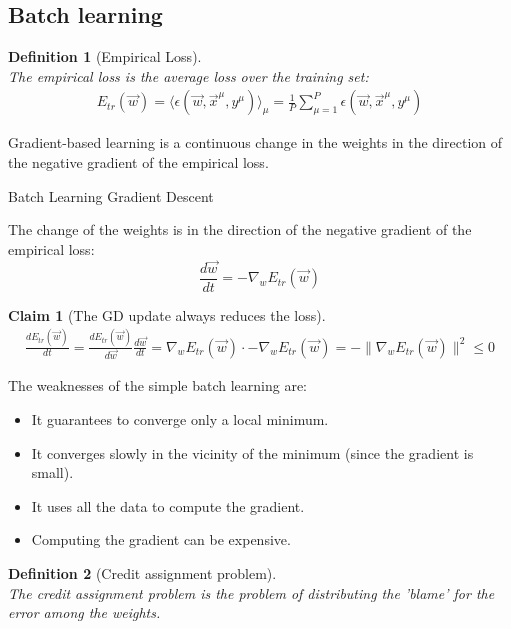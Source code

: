 \documentclass[11pt]{book} %
\newtheorem{definition}{Definition}[section]
\newtheorem*{claim*}{Claim}
\begin{document}
%
%

\subsection{Batch learning}

\begin{definition}[Empirical Loss]\ \\
    The empirical loss is the average loss over the training set:
    \begin{align}
        E_{tr}(\vec{w}) = \langle \epsilon(\vec{w}, \vec{x}^\mu, y^\mu ) \rangle_\mu =\frac{1}{P} \sum_{\mu=1}^{P} \epsilon (\vec{w}, \vec{x}^\mu, y^\mu)
    \end{align}
\end{definition}

Gradient-based learning is a continuous change in the weights in the direction of the negative gradient of the empirical loss.

\begin{algorithm}[H]
    \SetAlgoLined
    \caption{Batch Learning Gradient Descent}
    The change of the weights is in the direction of the negative gradient of the empirical loss:
    \[ \frac{d\vec{w}}{dt} = -\nabla_w E_{tr}(\vec{w}) \]
\end{algorithm}
    

\begin{claim*}[The GD update always reduces the loss]\ \\
    \begin{align}
        \frac{d E_{tr}(\vec{w})}{dt} = \frac{dE_{tr}(\vec{w})}{d\vec{w}}  \frac{d\vec{w}}{dt} = 
        \nabla_w E_{tr}(\vec{w}) \cdot -\nabla_w E_{tr}(\vec{w}) =  - \lVert \nabla_w E_{tr}(\vec{w}) \rVert^2 \leq 0
    \end{align}
\end{claim*}

The weaknesses of the simple batch learning are:
\begin{itemize}
    \item It guarantees to converge only a local minimum.
    \item It converges slowly in the vicinity of the minimum (since the gradient is small).
    \item It uses all the data to compute the gradient.
    \item Computing the gradient can be expensive.
\end{itemize}

\begin{definition}[Credit assignment problem]\ \\
    The credit assignment problem is the problem of distributing the 'blame' for the error among the weights.
\end{definition}
\end{document}

